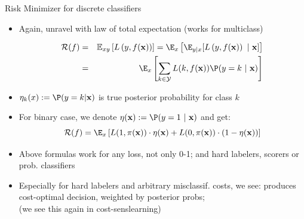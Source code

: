 \documentclass[11pt,compress,t,notes=noshow, xcolor=table]{beamer}
\begin{document}
\begin{vbframe}{Risk Minimizer for discrete classifiers}

\begin{itemize}

\item Again, unravel with law of total expectation (works for multiclass)

\vspace*{-0.5cm}

\begin{eqnarray*}
  \riskf  & = & \Exy\left[\Lxy\right] = \E_x \left[ \E_{y|x} [ \Lxy ~|~ \xv ] \right] \\
          & = & \E_x \left[\sum_{k \in \Yspace} L(k, \fx) \P(y = k~|~ \xv)\right] 
\end{eqnarray*}

\item $\eta_k(x) := \P(y = k| \xv)$ is true posterior probability for class $k$

\item For binary case, we denote $\eta(\xv) := \P(y = 1 ~|~ \xv)$ and get: 
$$
\riskf = \E_x \left[L(1, \pix) \cdot \eta(\xv) + L(0, \pix) \cdot (1 - \eta(\xv)) \right]
$$

\item Above formulas work for any loss, not only 0-1; and hard labelers, scorers or prob. classifiers

\item Especially for hard labelers and arbitrary misclassif. costs, we see: produces cost-optimal decision, weighted by posterior probs; \\
(we see this again in cost-senslearning)





\end{itemize}

\end{vbframe}
\end{document}

